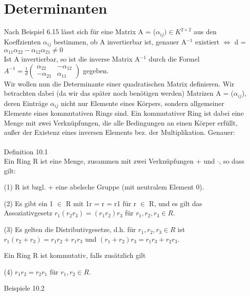 \documentclass[fontsize=10pt]{scrartcl}
\begin{document}
\section{Determinanten}
Nach Beispiel 6.15 lässt sich für eine Matrix A = ($\alpha_{ij}) \in K^{2 \times 2}$ aus den Koeffzienten $\alpha_{ij}$ bestimmen, ob A invertierbar ist, genauer A$^{-1}$ existiert $\Leftrightarrow$ d = $\alpha_{11}\alpha_{22} - \alpha_{12}\alpha_{21} \neq 0$\\
Ist A invertierbar, so ist die inverse Matrix A$^{-1}$ durch die Formel $A^{-1} = \frac{1}{d} \begin{pmatrix} \alpha_{22} & -\alpha_{12} \\ -\alpha_{21} & \alpha_{11} \end{pmatrix}$ gegeben.\\
Wir wollen nun die Determinante einer quadratischen Matrix definieren. Wir betrachten dabei (da wir das später noch benötigen werden) Matrizen A = ($\alpha_{ij}$), deren Einträge $\alpha_{ij}$ nicht nur Elemente eines Körpers, sondern allgemeiner Elemente eines kommutativen Rings sind. Ein kommutativer Ring ist dabei eine Menge mit zwei Verknüpfungen, die alle Bedingungen an einen Körper erfüllt, außer der Existenz eines inversen Elements bez. der Multiplikation. Genauer:\\
\\
Definition 10.1\\
Ein Ring R ist eine Menge, zusammen mit zwei Verknüpfungen + und $\cdot$, so dass gilt:
\begin{compactenum}
\item[(1)] R ist bzgl. + eine abelsche Gruppe (mit neutralem Element 0).
\item[(2)] Es gibt ein 1 $\in$ R mit 1r = r = r1 für r $\in$ R, und es gilt das Assoziativgesetz $r_1(r_2r_3) = (r_1r_2)r_3$ für $r_1, r_2, r_3 \in R$.
\item[(3)] Es gelten die Distributivgesetze, d.h. für $r_1, r_2, r_3 \in R$ ist $r_1(r_2 + r_3) = r_1r_2 + r_1r_3$ und $(r_1 + r_2)r_3 = r_1r_3 + r_2r_3$.
\end{compactenum}
Ein Ring R ist kommutativ, falls zusätzlich gilt
\begin{compactenum}
\item[(4)] $r_1r_2 = r_2r_1$ für $r_1,r_2 \in R$.\\
\end{compactenum}
Beispiele 10.2
\end{document}
